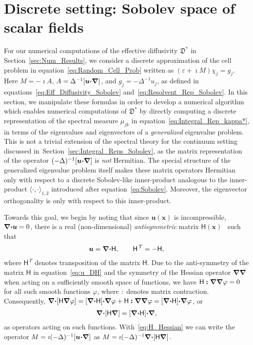 \documentclass[english,12pt,jmp,graphicx]{revtex4-1}
\newcommand{\vecu}{\boldsymbol{u}}
\newcommand{\vecx}{\boldsymbol{x}}
\newcommand{\secref}[1]{Section~\ref{#1}}
\newcommand{\bnabla}{\mbox{\boldmath${\nabla}$}}
\newcommand{\bcdot}{\mbox{\boldmath${\cdot}$}}
\newcommand{\Dg}{\mathfrak{D}}
\newcommand{\bcolon}{\boldsymbol{:}}
\newcommand{\Hm}{\mathsf{H}}
\newcommand{\Qm}{\mathsf{Q}}
\begin{document}
\section{Discrete setting: Sobolev space of scalar fields} 
\label{sec:Matrix_Sobolev}  
%
For our numerical computations of the effective diffusivity $\Dg^*$ in
\secref{sec:Num_Results}, we consider a discrete approximation of 
the cell problem in equation~\eqref{eq:Random_Cell_Prob} written as
$(\varepsilon+\imath M)\chi_j=g_j$. Here $M=-\imath A$,
$A=\Delta^{-1}[\vecu\bcdot\bnabla]$, and  $g_j=-\Delta^{-1}u_j$, as
defined in equations~\eqref{eq:Eff_Diffusivity_Sobolev}
and~\eqref{eq:Resolvent_Rep_Sobolev}. In this section, we manipulate
these formulas in order to develop a numerical algorithm which enables
numerical computations of $\Dg^*$ by directly computing a discrete
representation of the spectral measure $\mu_{jk}$ in
equation~\eqref{eq:Integral_Rep_kappa*}, in terms of the
eigenvalues and eigenvectors of a \emph{generalized} eigenvalue problem.
This is not a trivial extension of the spectral theory for the
continuum setting discussed in~\secref{sec:Integral_Reps_Sobolev}, as
the matrix 
representation of the operator $(-\Delta)^{-1}[\vecu\bcdot\bnabla]$ is
\emph{not} Hermitian.
The special structure of the generalized 
eigenvalue problem itself makes these matrix operators Hermitian only with
respect to a discrete Sobolev-like inner-product analogous to the
inner-product $\langle\cdot,\cdot\rangle_{1,2}$ introduced
after equation~\eqref{eq:Sobolev}. Moreover, the eigenvector orthogonality is
only with respect to this inner-product.  



Towards this goal, we begin by noting that since $\vecu(\vecx)$ is
incompressible, $\bnabla\bcdot\vecu=0$, there is a real
(non-dimensional) \emph{antisymmetric} 
matrix
$\Hm(\vecx)$~\cite{Avellaneda:PRL-753,Avellaneda:CMP-339} such that 
% 
\begin{align}\label{eq:u_DH}
 \vecu=\bnabla\bcdot\Hm, \qquad  \Hm^{\,T}=-\Hm,
\end{align}
% 
where $\Hm^{\,T}$ denotes transposition of the matrix $\Hm$.
Due to the anti-symmetry of the matrix $\Hm$ in equation~\eqref{eq:u_DH} and
the symmetry of the 
Hessian operator $\bnabla\bnabla$ when acting on a sufficiently smooth
space of functions, we have $\Hm\bcolon\bnabla\bnabla\varphi=0$ for all
such smooth functions $\varphi$, where $\bcolon$ denotes matrix
contraction. Consequently, 
$\bnabla\bcdot[\Hm\bnabla\varphi]=[\bnabla\bcdot\Hm]\bcdot\bnabla\varphi+\Hm\bcolon\bnabla\bnabla\varphi=[\bnabla\bcdot\Hm]\bcdot\bnabla\varphi$,
or
%
\begin{align}\label{eq:H_Hessian}
  \bnabla\bcdot[\Hm\bnabla]=[\bnabla\bcdot\Hm]\bcdot\bnabla,
\end{align}
%
as operators acting on such functions. With~\eqref{eq:H_Hessian} we
can write the operator $M=\imath 
(-\Delta)^{-1}[\vecu\bcdot\bnabla]$ as
$M=\imath(-\Delta)^{-1}\bnabla\bcdot[\Hm\bnabla]\,.$
\end{document}
